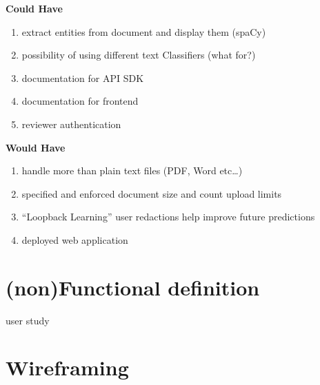 \documentclass{l4proj}
\begin{document}
\vspace{0.5cm}

\begin{minipage}[t]{.5\linewidth}
    \centerline{\textbf{Could Have}}
    \begin{enumerate}[label=\textbf{C\arabic*}]
        \item extract entities from document and display them (spaCy)
        \item possibility of using different text Classifiers (what for?)
        \item documentation for API SDK
        \item documentation for frontend
        \item reviewer authentication
    \end{enumerate}
\end{minipage}
\hfill
\noindent
\begin{minipage}[t]{.5\linewidth}
    \centerline{\textbf{Would Have}}
    \begin{enumerate}[label=\textbf{W\arabic*}]
        \item handle more than plain text files (PDF, Word etc…)
        \item specified and enforced document size and count upload limits
        \item ``Loopback Learning'' user redactions help improve future predictions
        \item deployed web application
    \end{enumerate}
\end{minipage}

\section{(non)Functional definition}

user study

\section{Wireframing}
\end{document}
